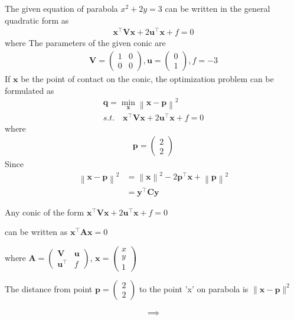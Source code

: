 \documentclass[journal,10pt,twocolumn]{article}
\providecommand{\norm}[1]{\left\lVert#1\right\rVert}
\let\vec\mathbf
\newcommand{\myvec}[1]{\ensuremath{\begin{pmatrix}#1\end{pmatrix}}}
\begin{document}
The given equation of parabola $x^2+2y=3$ can be written in the general quadratic form as
\begin{align}
    \vec{x}^{\top}\vec{V}\vec{x}+2\vec{u}^{\top}\vec{x}+f=0
    \end{align}
where
\fi
The parameters of the given conic are
\begin{align}
	\label{eq:12/6/6/22V_matrix}
	\vec{V} = \myvec{1 & 0\\0 & 0},
	\vec{u} = \myvec{0\\1},
	f =-3
\end{align}
If $\vec{x}$ be the point of contact on the conic, the optimization problem can be formulated as 
\begin{align}
	\label{eq:12/6/6/22/quad}
	\vec{q} = \min_{\vec{x}}\norm{\vec{x}-\vec{p}}^2
	\\
	s.t. \quad 
    \vec{x}^{\top}\vec{V}\vec{x}+2\vec{u}^{\top}\vec{x}+f=0
    \label{eq:12/6/6/22conic_quad_form}
\end{align}
%
where 
\begin{align}
	\vec{p} = \myvec{2 \\ 2}
\end{align}
Since 
\begin{align}
	\norm{\vec{x}-\vec{p}}^2 &= 
	\norm{\vec{x}}^2 - 2\vec{p}^{\top}\vec{x} + \norm{\vec{p}}^2
	\\
	&= 
\vec{y}^{\top}\vec{C}\vec{y}
\end{align}
\iffalse
\begin{center}
 Any conic of the form  $\vec{x^{\top}}\vec{V}\vec{x} + 2\vec{u^{\top}}\vec{x} + f = 0$ \end{center}
\begin{center} can be written as $\vec{x^{\top}}\vec{A}\vec{x} = 0$\end{center} 
\begin{center}
where $\vec{A} = \myvec{\vec{V}&\vec{u}\\\vec{u^{\top}}&f}$, $\vec{x} =\myvec{x\\y\\1}$
\end{center}
\begin{center}
The distance from point $\vec{p} = \myvec{2\\2}$ to the point 'x' on parabola is $\|\vec{x}-\vec{p}\|^2$
\end{center}

\begin{gather*}
	\implies 
\end{gather*}
\end{document}
